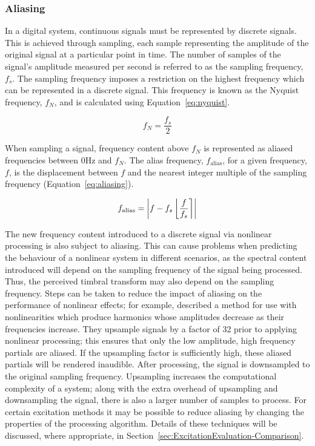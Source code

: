 		\subsubsection*{Aliasing}
			In a digital system, continuous signals must be represented by discrete signals. This is achieved
			through sampling, each sample representing the amplitude of the original signal at a particular
			point in time. The number of samples of the signal's amplitude measured per second is referred to
			as the sampling frequency, $f_{s}$. The sampling frequency imposes a restriction on the highest
			frequency which can be represented in a discrete signal. This frequency is known as the Nyquist
			frequency, $f_{N}$, and is calculated using Equation~\ref{eq:nyquist}.

			\begin{equation}
				f_{N} = \frac{f_{s}}{2}
				\label{eq:nyquist}
			\end{equation}

			When sampling a signal, frequency content above $f_{N}$ is represented as aliased frequencies
			between 0Hz and $f_{N}$. The alias frequency, $f_{\mathrm{alias}}$, for a given frequency, $f$, is
			the displacement between $f$ and the nearest integer multiple of the sampling frequency
			(Equation~\ref{eq:aliasing}).

			\begin{equation}
				f_{\mathrm{alias}} = \left|f - f_{s}\left\lfloor\frac{f}{f_{s}}\right\rceil\right|
				\label{eq:aliasing}
			\end{equation}

			The new frequency content introduced to a discrete signal via nonlinear processing is also subject
			to aliasing. This can cause problems when predicting the behaviour of a nonlinear system in
			different scenarios, as the spectral content introduced will depend on the sampling frequency of
			the signal being processed. Thus, the perceived timbral transform may also depend on the sampling
			frequency. Steps can be taken to reduce the impact of aliasing on the performance of nonlinear
			effects; for example, \citet{vetter2013estimation} described a method for use with nonlinearities
			which produce harmonics whose amplitudes decrease as their frequencies increase. They upsample
			signals by a factor of 32 prior to applying nonlinear processing; this ensures that only the low
			amplitude, high frequency partials are aliased. If the upsampling factor is sufficiently high,
			these aliased partials will be rendered inaudible. After processing, the signal is downsampled to
			the original sampling frequency. Upsampling increases the computational complexity of a system;
			along with the extra overhead of upsampling and downsampling the signal, there is also a larger
			number of samples to process. For certain excitation methods it may be possible to reduce aliasing
			by changing the properties of the processing algorithm. Details of these techniques will be
			discussed, where appropriate, in Section~\ref{sec:ExcitationEvaluation-Comparison}.

